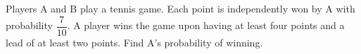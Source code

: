 Players A and B play a tennis game. Each point is independently won by A with probability $\dfrac{7}{10}$. A player wins the game upon having at least four points and a lead of at least two points. Find A's probability of winning.
